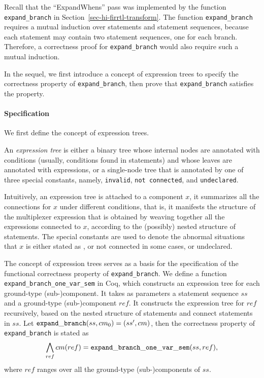 
Recall that the ``ExpandWhens'' pass was implemented by the function {\tt expand\_branch} in Section~\ref{sec-hi-firrtl-transform}. 
The function {\tt expand\_branch} requires a mutual induction over statements and statement sequences, because each  statement may contain two statement sequences, one for each branch. Therefore, a correctness proof for  {\tt expand\_branch} would also require such a mutual induction. 


In the sequel, we first introduce a concept of expression trees to specify the correctness property of {\tt expand\_branch}, then prove that {\tt expand\_branch} satisfies the property. 

\paragraph*{Specification}
We first define the concept of expression trees. 
%
\begin{definition}
An \emph{expression tree} is either a binary tree whose internal nodes are annotated with conditions
(usually, conditions found in  statements) and whose leaves are annotated with expressions, or a single-node tree that is annotated by one of three special constants, namely, 
{\tt invalid}, {\tt not connected}, and {\tt undeclared}.
\end{definition}
Intuitively,  an expression tree is attached to a component $x$, it summarizes all the connections for $x$ under different conditions, that is, it manifests the structure of the multiplexer expression that is obtained by weaving together all the expressions connected to $x$, according to the (possibly) nested structure of  statements. The special constants are used to denote the abnormal situations that $x$ is either stated as , or not connected in some cases, or undeclared.  

The concept of expression trees serves as a basis for the specification of the functional correctness property of {\tt expand\_branch}.  
We define a function {\tt expand\_branch\_one\_var\_sem} in Coq, which constructs an expression tree for each ground-type (sub-)component.
It takes as parameters a statement sequence $ss$ and a ground-type (sub-)component $\mathit{ref}$. 
It constructs the expression tree for $\mathit{ref}$ recursively, based on the nested structure of  statements and connect statements in $ss$.
Let ${\tt expand\_branch}(ss, cm_0) = (ss', cm)$, then the correctness property of {\tt expand\_branch} is stated as 
%
\begin{equation}\label{eqn-correct-when}
\bigwedge \limits_{ref} cm(ref) = {\tt expand\_branch\_one\_var\_sem}(ss, ref),
\end{equation}
%
where $ref$ ranges over all the ground-type (sub-)components of $ss$.


